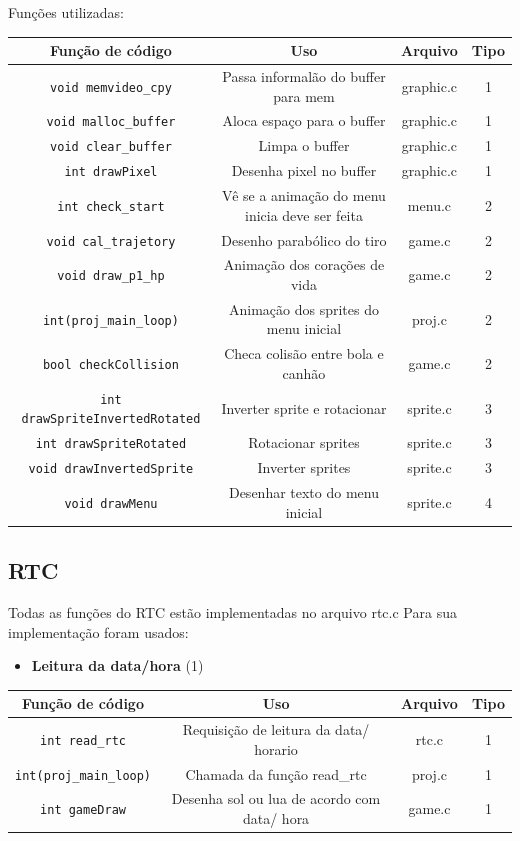\documentclass[12pt]{article}
\begin{document}
Funções utilizadas: 
\begin{center}
    \begin{tabular}{|c|c|c|c|}
        \hline
        Função de código& Uso & Arquivo & Tipo\\
        \hline
        \texttt{void memvideo\_cpy} & Passa informalão do buffer para mem & graphic.c & 1 \\
        \texttt{void malloc\_buffer} & Aloca espaço para o buffer & graphic.c & 1\\  
        \texttt{void clear\_buffer} & Limpa o buffer & graphic.c & 1 \\
        \texttt{int drawPixel} & Desenha pixel no buffer & graphic.c & 1 \\ 
        \texttt{int check\_start} & Vê se a animação do menu inicia deve ser feita & menu.c & 2\\
        \texttt{void cal\_trajetory} & Desenho parabólico do tiro & game.c & 2 \\
        \texttt{void draw\_p1\_hp} & Animação dos corações de vida & game.c & 2 \\ 
        \texttt{int(proj\_main\_loop)} & Animação dos sprites do menu inicial & proj.c & 2 \\
        \texttt{bool checkCollision} & Checa colisão entre bola e canhão & game.c & 2\\ 
        \texttt{int drawSpriteInvertedRotated} & Inverter sprite e rotacionar & sprite.c & 3\\
        \texttt{int drawSpriteRotated} & Rotacionar sprites & sprite.c & 3 \\ 
        \texttt{void drawInvertedSprite} & Inverter sprites & sprite.c & 3 \\
        \texttt{void drawMenu} & Desenhar texto do menu inicial & sprite.c & 4 \\ 
        
        \hline
    \end{tabular}
\end{center}

\subsection{RTC}
Todas as funções do RTC estão implementadas no arquivo rtc.c 
Para sua implementação foram usados: 
\begin{itemize}
    \item \textbf{Leitura da data/hora} (1)
\end{itemize}
\begin{center}
    \begin{tabular}{|c|c|c|c|}
        \hline
        Função de código & Uso & Arquivo & Tipo \\ 
        \hline 
        \texttt{int read\_rtc} & Requisição de leitura da data/ horario & rtc.c & 1 \\
        \texttt{int(proj\_main\_loop)} & Chamada da função read\_rtc & proj.c & 1 \\
        \texttt{int gameDraw} & Desenha sol ou lua de acordo com data/ hora & game.c & 1 \\
        \hline
    \end{tabular}
\end{center}
\end{document}
